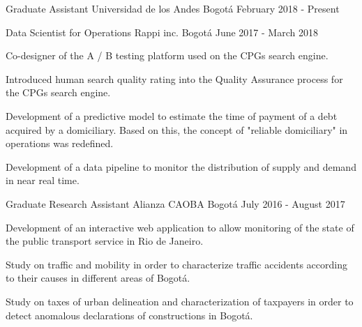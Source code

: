 


\begin{cventries}
    \cventry
    {Graduate Assistant}
    {Universidad de los Andes}
    {Bogotá}
    {February 2018 - Present}
    {
    }

    \cventry
    {Data Scientist for Operations} %
    {Rappi inc.} %
    {Bogotá} %
    {June 2017 - March 2018} %
    {
        \begin{cvitems}
        \item{Co-designer of the A / B testing platform used on the CPGs search engine.}
        \item{Introduced human search quality rating into the Quality Assurance process for the CPGs search engine.}
        \item{Development of a predictive model to estimate the time of payment of a debt acquired by a domiciliary. Based on this, the concept of "reliable domiciliary" in operations was redefined.}
        \item{Development of a data pipeline to monitor the distribution of supply and demand in near real time.}
        \end{cvitems}
    } %


    \cventry
    {Graduate Research Assistant} %
    {Alianza CAOBA} %
    {Bogotá} %
    {July 2016 - August 2017} %
    {
        \begin{cvitems}
        \item{Development of an interactive web application to allow monitoring of the state of the public transport service in Rio de Janeiro.}
        \item{Study on traffic and mobility in order to characterize traffic accidents according to their causes in different areas of Bogotá.}
        \item{Study on taxes of urban delineation and characterization of taxpayers in order to detect anomalous declarations of constructions in Bogotá.}
        \end{cvitems}
    } %


    \vspace{-0.5cm}
\end{cventries}

